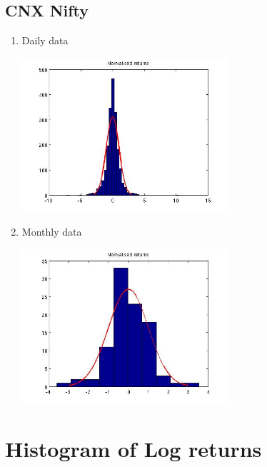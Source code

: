 \documentclass[12pt]{article}
\begin{document}
  \subsection*{CNX Nifty}
  \begin{enumerate}
    \item Daily data
      \begin{center}
        \includegraphics[width=3in]{niftydailynr.jpg}
      \end{center}
    \item Monthly data
      \begin{center}
        \includegraphics[width=3in]{niftymonthlynr.jpg}
      \end{center}
  \end{enumerate}

\newpage
\section{Histogram of Log returns}
\end{document}
